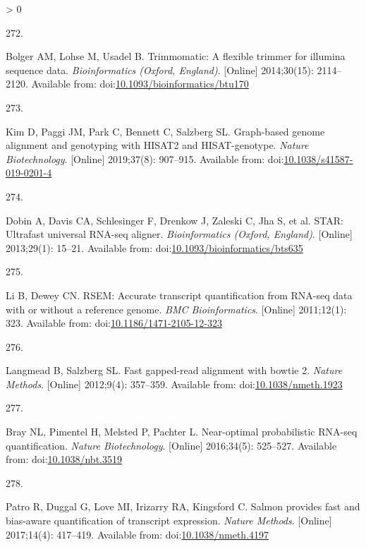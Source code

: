 \documentclass[twoside,10pt]{gihclass} %
\newlength{\cslhangindent}
\newlength{\csllabelwidth}
\newenvironment{CSLReferences}[3] %
 {%
  \setlength{\parindent}{0pt}
  \ifodd #1 \everypar{\setlength{\hangindent}{\cslhangindent}}\ignorespaces\fi
  \ifnum #2 > 0
  \setlength{\parskip}{#2\baselineskip}
  \fi
 }%
 {}
\newcommand{\CSLLeftMargin}[1]{\parbox[t]{\maxof{\widthof{#1}}{\csllabelwidth}}{#1}}
\newcommand{\CSLRightInline}[1]{\parbox[t]{\linewidth}{#1}}
\begin{document}
\begin{CSLReferences}{0}{0}
\leavevmode\hypertarget{ref-RN2382}{}%
\CSLLeftMargin{272. }
\CSLRightInline{Bolger AM, Lohse M, Usadel B. Trimmomatic: A flexible trimmer for illumina sequence data. \emph{Bioinformatics (Oxford, England)}. {[}Online{]} 2014;30(15): 2114--2120. Available from: doi:\href{https://doi.org/10.1093/bioinformatics/btu170}{10.1093/bioinformatics/btu170}}

\leavevmode\hypertarget{ref-RN2385}{}%
\CSLLeftMargin{273. }
\CSLRightInline{Kim D, Paggi JM, Park C, Bennett C, Salzberg SL. Graph-based genome alignment and genotyping with HISAT2 and HISAT-genotype. \emph{Nature Biotechnology}. {[}Online{]} 2019;37(8): 907--915. Available from: doi:\href{https://doi.org/10.1038/s41587-019-0201-4}{10.1038/s41587-019-0201-4}}

\leavevmode\hypertarget{ref-RN2386}{}%
\CSLLeftMargin{274. }
\CSLRightInline{Dobin A, Davis CA, Schlesinger F, Drenkow J, Zaleski C, Jha S, et al. STAR: Ultrafast universal RNA-seq aligner. \emph{Bioinformatics (Oxford, England)}. {[}Online{]} 2013;29(1): 15--21. Available from: doi:\href{https://doi.org/10.1093/bioinformatics/bts635}{10.1093/bioinformatics/bts635}}

\leavevmode\hypertarget{ref-RN2387}{}%
\CSLLeftMargin{275. }
\CSLRightInline{Li B, Dewey CN. RSEM: Accurate transcript quantification from RNA-seq data with or without a reference genome. \emph{BMC Bioinformatics}. {[}Online{]} 2011;12(1): 323. Available from: doi:\href{https://doi.org/10.1186/1471-2105-12-323}{10.1186/1471-2105-12-323}}

\leavevmode\hypertarget{ref-RN2388}{}%
\CSLLeftMargin{276. }
\CSLRightInline{Langmead B, Salzberg SL. Fast gapped-read alignment with bowtie 2. \emph{Nature Methods}. {[}Online{]} 2012;9(4): 357--359. Available from: doi:\href{https://doi.org/10.1038/nmeth.1923}{10.1038/nmeth.1923}}

\leavevmode\hypertarget{ref-RN2389}{}%
\CSLLeftMargin{277. }
\CSLRightInline{Bray NL, Pimentel H, Melsted P, Pachter L. Near-optimal probabilistic RNA-seq quantification. \emph{Nature Biotechnology}. {[}Online{]} 2016;34(5): 525--527. Available from: doi:\href{https://doi.org/10.1038/nbt.3519}{10.1038/nbt.3519}}

\leavevmode\hypertarget{ref-RN2390}{}%
\CSLLeftMargin{278. }
\CSLRightInline{Patro R, Duggal G, Love MI, Irizarry RA, Kingsford C. Salmon provides fast and bias-aware quantification of transcript expression. \emph{Nature Methods}. {[}Online{]} 2017;14(4): 417--419. Available from: doi:\href{https://doi.org/10.1038/nmeth.4197}{10.1038/nmeth.4197}}


\end{CSLReferences}
\end{document}
